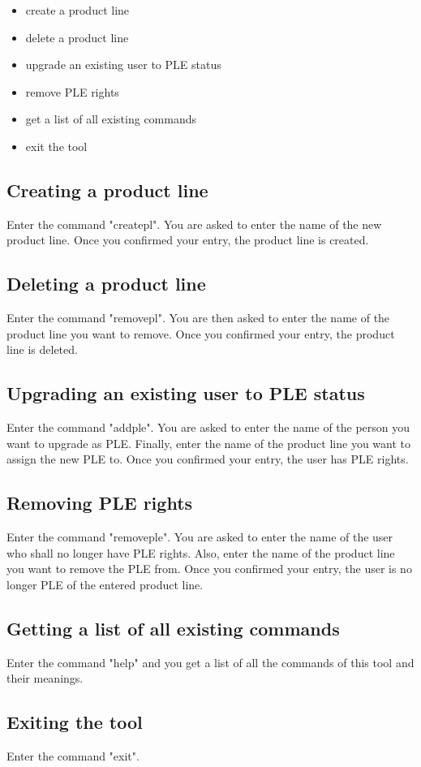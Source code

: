 \begin{itemize}
	\item create a product line
	\item delete a product line
	\item upgrade an existing user to PLE status
	\item remove PLE rights
	\item get a list of all existing commands
	\item exit the tool
\end{itemize}

\subsection{Creating a product line}
Enter the command "createpl". You are asked to enter the name of the new product
line. Once you confirmed your entry, the product line is created.

\subsection{Deleting a product line}
Enter the command "removepl". You are then asked to enter the name of the product
line you want to remove. Once you confirmed your entry, the product line is deleted.

\subsection{Upgrading an existing user to PLE status}
Enter the command "addple". You are asked to enter the name of the person you want
to upgrade as PLE. Finally, enter the name of the product line you want to assign
the new PLE to. Once you confirmed your entry, the user has PLE rights.

\subsection{Removing PLE rights}
Enter the command "removeple". You are asked to enter the name of the user who shall 
no longer have PLE rights. Also, enter the name of the product line you want to
remove the PLE from. Once you confirmed your entry, the user is no longer PLE of
the entered product line.

\subsection{Getting a list of all existing commands}
Enter the command "help" and you get a list of all the commands of this tool and
their meanings.

\subsection{Exiting the tool}
Enter the command "exit".